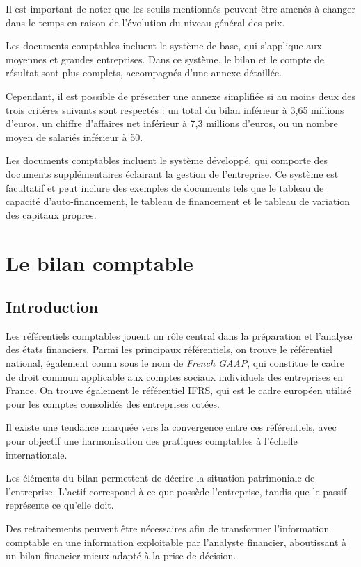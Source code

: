 \documentclass[a4paper, 12pt]{report}
\begin{document}
Il est important de noter que les seuils mentionnés peuvent être amenés à changer dans le temps en raison de l'évolution du niveau général des prix.

Les documents comptables incluent le système de base, qui s'applique aux moyennes et grandes entreprises. Dans ce système, le bilan et le compte de résultat sont plus complets, accompagnés d'une annexe détaillée.

Cependant, il est possible de présenter une annexe simplifiée si au moins deux des trois critères suivants sont respectés : un total du bilan inférieur à 3,65 millions d'euros, un chiffre d'affaires net inférieur à 7,3 millions d'euros, ou un nombre moyen de salariés inférieur à 50.

Les documents comptables incluent le système développé, qui comporte des documents supplémentaires éclairant la gestion de l'entreprise. Ce système est facultatif et peut inclure des exemples de documents tels que le tableau de capacité d'auto-financement, le tableau de financement et le tableau de variation des capitaux propres.

\chapter{Le bilan comptable}

\section*{Introduction}

Les référentiels comptables jouent un rôle central dans la préparation et l'analyse des états financiers. Parmi les principaux référentiels, on trouve le référentiel national, également connu sous le nom de \textit{French GAAP}, qui constitue le cadre de droit commun applicable aux comptes sociaux individuels des entreprises en France. On trouve également le référentiel IFRS, qui est le cadre européen utilisé pour les comptes consolidés des entreprises cotées. 

Il existe une tendance marquée vers la convergence entre ces référentiels, avec pour objectif une harmonisation des pratiques comptables à l'échelle internationale. 

Les éléments du bilan permettent de décrire la situation patrimoniale de l'entreprise. L'actif correspond à ce que possède l'entreprise, tandis que le passif représente ce qu'elle doit. 

Des retraitements peuvent être nécessaires afin de transformer l'information comptable en une information exploitable par l'analyste financier, aboutissant à un bilan financier mieux adapté à la prise de décision.
\end{document}
